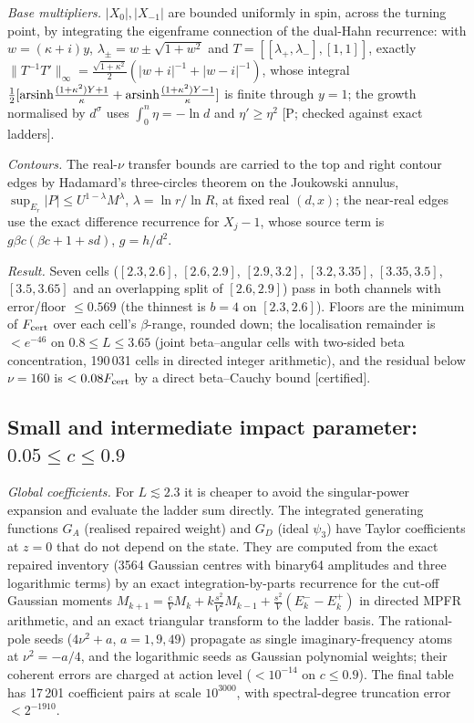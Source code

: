 \emph{Base multipliers.} $|X_0|,|X_{-1}|$ are bounded uniformly in spin, across the turning point, by integrating the eigenframe
connection of the dual-Hahn recurrence: with $w=(\kappa+i)y$, $\lambda_\pm=w\pm\sqrt{1+w^2}$ and $T=[[\lambda_+,\lambda_-],[1,1]]$,
exactly $\|T^{-1}T'\|_\infty=\frac{\sqrt{1+\kappa^2}}2(|w+i|^{-1}+|w-i|^{-1})$, whose integral
$\frac12[{\rm arsinh}\frac{(1+\kappa^2)Y+1}\kappa+{\rm arsinh}\frac{(1+\kappa^2)Y-1}\kappa]$ is finite through $y=1$; the growth normalised
by $d^\sigma$ uses $\int_0^n\eta=-\ln d$ and $\eta'\ge\eta^2$ [P; checked against exact ladders].

\emph{Contours.} The real-$\nu$ transfer bounds are carried to the top and right contour edges by Hadamard's three-circles theorem on
the Joukowski annulus, $\sup_{E_r}|P|\le U^{1-\lambda}M^\lambda$, $\lambda=\ln r/\ln R$, at fixed real $(d,x)$; the near-real edges use
the exact difference recurrence for $X_j-1$, whose source term is $g\beta c(\beta c+1+sd)$, $g=h/d^2$.

\emph{Result.} Seven cells ($[2.3,2.6]$, $[2.6,2.9]$, $[2.9,3.2]$, $[3.2,3.35]$, $[3.35,3.5]$, $[3.5,3.65]$ and an overlapping split of
$[2.6,2.9]$) pass in both channels with error/floor $\le0.569$ (the thinnest is $b=4$ on $[2.3,2.6]$). Floors are the minimum of
$F_{\rm cert}$ over each cell's $\beta$-range, rounded down; the localisation remainder is $<e^{-46}$ on $0.8\le L\le3.65$ (joint
beta--angular cells with two-sided beta concentration, 190\,031 cells in directed integer arithmetic), and the residual below
$\nu=160$ is $<0.08F_{\rm cert}$ by a direct beta--Cauchy bound [certified].

\subsection{Small and intermediate impact parameter: \texorpdfstring{$0.05\le c\le0.9$}{0.05 <= c <= 0.9}}
\emph{Global coefficients.} For $L\lesssim2.3$ it is cheaper to avoid the singular-power expansion and evaluate the ladder sum directly.
The integrated generating functions $G_A$ (realised repaired weight) and $G_D$ (ideal $\psi_3$) have Taylor coefficients at $z=0$ that do
not depend on the state. They are computed from the exact repaired inventory (3564 Gaussian centres with binary64 amplitudes and three
logarithmic terms) by an exact integration-by-parts recurrence for the cut-off Gaussian moments
$M_{k+1}=\frac cVM_k+k\frac{s^2}{V^2}M_{k-1}+\frac{s^2}V(E^-_k-E^+_k)$ in directed MPFR arithmetic, and an exact triangular transform to the
ladder basis. The rational-pole seeds ($4\nu^2+a$, $a=1,9,49$) propagate as single imaginary-frequency atoms at $\nu^2=-a/4$, and the
logarithmic seeds as Gaussian polynomial weights; their coherent errors are charged at action level ($<10^{-14}$ on $c\le0.9$). The
final table has 17\,201 coefficient pairs at scale $10^{3000}$, with spectral-degree truncation error $<2^{-1910}$.

